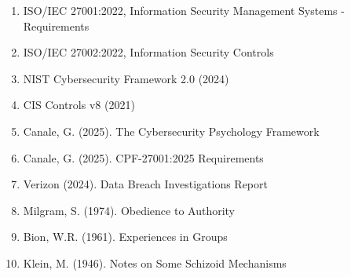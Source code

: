 \documentclass[11pt,a4paper]{article}
\begin{document}
\begin{enumerate}
\item ISO/IEC 27001:2022, Information Security Management Systems - Requirements
\item ISO/IEC 27002:2022, Information Security Controls
\item NIST Cybersecurity Framework 2.0 (2024)
\item CIS Controls v8 (2021)
\item Canale, G. (2025). The Cybersecurity Psychology Framework
\item Canale, G. (2025). CPF-27001:2025 Requirements
\item Verizon (2024). Data Breach Investigations Report
\item Milgram, S. (1974). Obedience to Authority
\item Bion, W.R. (1961). Experiences in Groups
\item Klein, M. (1946). Notes on Some Schizoid Mechanisms
\end{enumerate}
\end{document}
